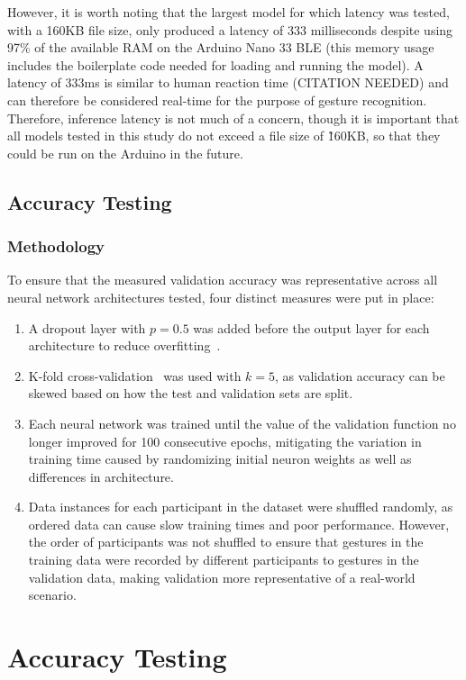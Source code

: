 However, it is worth noting that the largest model for which latency was tested, with a 160KB file size, only produced a latency of 333 milliseconds despite using 97\% of the available RAM on the Arduino Nano 33 BLE (this memory usage includes the boilerplate code needed for loading and running the model).
A latency of 333ms is similar to human reaction time (CITATION NEEDED) and can therefore be considered real-time for the purpose of gesture recognition.
Therefore, inference latency is not much of a concern, though it is important that all models tested in this study do not exceed a file size of \~160KB, so that they could be run on the Arduino in the future.

\subsection{Accuracy Testing}\label{subsec:accuracy-testing}
\subsubsection{Methodology}
To ensure that the measured validation accuracy was representative across all neural network architectures tested, four distinct measures were put in place:
\begin{enumerate}
    \item A dropout layer with $p=0.5$ was added before the output layer for each architecture to reduce overfitting~\cite{JMLR:v15:srivastava14a}.
    \item K-fold cross-validation~\cite{inbook} was used with $k=5$, as validation accuracy can be skewed based on how the test and validation sets are split.
    \item Each neural network was trained until the value of the validation function no longer improved for 100 consecutive epochs, mitigating the variation in training time caused by randomizing initial neuron weights as well as differences in architecture.
    \item Data instances for each participant in the dataset were shuffled randomly, as ordered data can cause slow training times and poor performance.
    However, the order of participants was not shuffled to ensure that gestures in the training data were recorded by different participants to gestures in the validation data, making validation more representative of a real-world scenario.
\end{enumerate}

\section{Accuracy Testing}\label{subsec:accuracy-testing-results}
